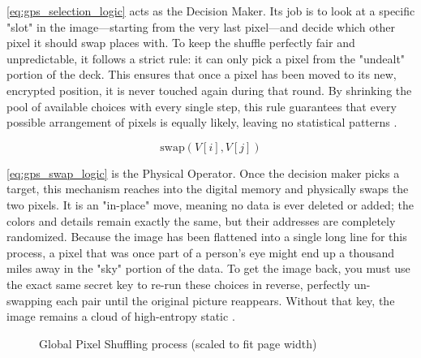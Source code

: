 \documentclass[12pt,fleqn]{article}
\begin{document}
\eqref{eq:gps_selection_logic} acts as the Decision Maker. Its job is to look at a specific "slot" in the image—starting from the very last pixel—and decide which other pixel it should swap places with. To keep the shuffle perfectly fair and unpredictable, it follows a strict rule: it can only pick a pixel from the "undealt" portion of the deck. This ensures that once a pixel has been moved to its new, encrypted position, it is never touched again during that round. By shrinking the pool of available choices with every single step, this rule guarantees that every possible arrangement of pixels is equally likely, leaving no statistical patterns \cite{durstenfeld1964algorithm}.

\begin{equation} \label{eq:gps_swap_logic}
\text{swap}(V[i], V[j])
\end{equation}

\eqref{eq:gps_swap_logic} is the Physical Operator. Once the decision maker picks a target, this mechanism reaches into the digital memory and physically swaps the two pixels. It is an "in-place" move, meaning no data is ever deleted or added; the colors and details remain exactly the same, but their addresses are completely randomized. Because the image has been flattened into a single long line for this process, a pixel that was once part of a person's eye might end up a thousand miles away in the "sky" portion of the data. To get the image back, you must use the exact same secret key to re-run these choices in reverse, perfectly un-swapping each pair until the original picture reappears. Without that key, the image remains a cloud of high-entropy static \cite{durstenfeld1964algorithm}.

\begin{figure}[H]
\raggedright
{}
\caption{Global Pixel Shuffling process (scaled to fit page width)}
\end{figure}
\end{document}
